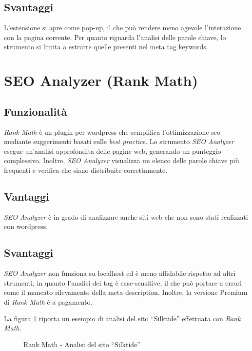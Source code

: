 \subsection{Svantaggi}
\par L'estensione si apre come pop-up, il che può rendere meno agevole l'interazione con la pagina corrente. Per quanto riguarda l'analisi delle parole chiave, lo strumento si limita a estrarre quelle presenti nel meta tag keywords.

\section{SEO Analyzer (Rank Math)}

\subsection{Funzionalità}
\par \textit{Rank Math} è un plugin per \gls{wordpress} che semplifica l'ottimizzazione \gls{seo} mediante suggerimenti basati sulle \textit{best practice}. Lo strumento \textit{SEO Analyzer} esegue un'analisi approfondita delle pagine web, generando un punteggio complessivo. Inoltre, \textit{SEO Analyzer} visualizza un elenco delle parole chiave più frequenti e verifica che siano distribuite correttamente.

\subsection{Vantaggi}
\par \textit{SEO Analyzer} è in grado di analizzare anche siti web che non sono stati realizzati con \gls{wordpress}.

\subsection{Svantaggi}
\par \textit{SEO Analyzer} non funziona su \gls{localhost} ed è meno affidabile rispetto ad altri strumenti, in quanto l'analisi dei tag è \gls{case-sensitive}, il che può portare a errori come il mancato rilevamento della meta description. Inoltre, la versione Premium di \textit{Rank Math} è a pagamento. 

\vspace{15pt}
\par\noindent La figura \ref{fig:rank_math_silktide} riporta un esempio di analisi del sito “Silktide” effettuata con \textit{Rank Math}.

\begin{figure}[H]
    \centering 
    \caption{Rank Math - Analisi del sito “Silktide”}
    \label{fig:rank_math_silktide}
\end{figure}